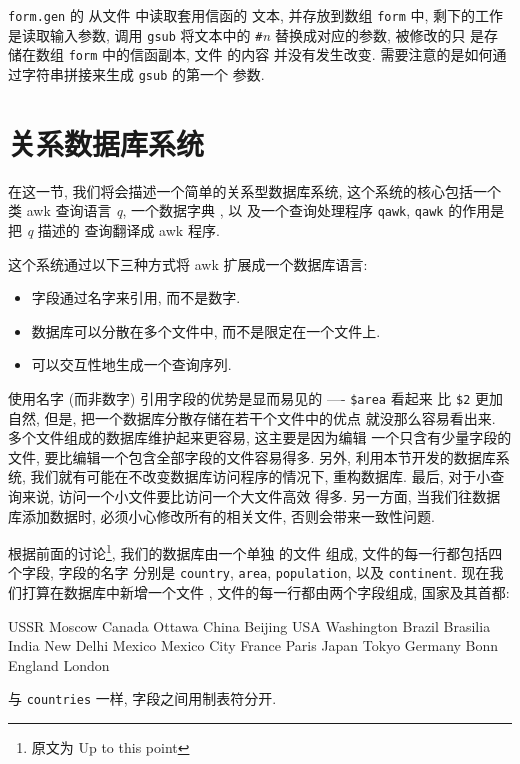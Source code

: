\verb'form.gen' 的 \BEGIN 从文件  中读取套用信函的
文本, 并存放到数组 \verb'form' 中, 剩下的工作是读取输入参数, 调用 
\verb'gsub' 将文本中的 \verb'#'\textit{n} 替换成对应的参数, 被修改的只 
是存储在数组 \verb'form' 中的信函副本, 文件  的内容
并没有发生改变. 需要注意的是如何通过字符串拼接来生成 \verb'gsub' 的第一个
参数.

\section{关系数据库系统}
\label{sec:a_relational_database_system}

在这一节, 我们将会描述一个简单的关系型数据库系统, 这个系统的核心包括一个
类 awk 查询语言 \textit{q}, 一个数据字典 , 以
及一个查询处理程序 \verb'qawk', \verb'qawk' 的作用是把 \textit{q} 描述的
查询翻译成 awk 程序.

这个系统通过以下三种方式将 awk 扩展成一个数据库语言:
\begin{itemize}
	\item 字段通过名字来引用, 而不是数字.
	\item 数据库可以分散在多个文件中, 而不是限定在一个文件上.
    \item 可以交互性地生成一个查询序列.
\end{itemize}
使用名字 (而非数字) 引用字段的优势是显而易见的 ---- \verb'$area' 看起来
比 \verb'$2' 更加自然, 但是, 把一个数据库分散存储在若干个文件中的优点
就没那么容易看出来. 多个文件组成的数据库维护起来更容易, 这主要是因为编辑
一个只含有少量字段的文件, 要比编辑一个包含全部字段的文件容易得多. 另外,
利用本节开发的数据库系统, 我们就有可能在不改变数据库访问程序的情况下,
重构数据库. 最后, 对于小查询来说, 访问一个小文件要比访问一个大文件高效
得多. 另一方面, 当我们往数据库添加数据时, 必须小心修改所有的相关文件, 
否则会带来一致性问题.

根据前面的讨论\footnote{原文为 Up to this point}, 我们的数据库由一个单独
的文件  组成, 文件的每一行都包括四个字段, 字段的名字
分别是 \verb'country', \verb'area', \verb'population', 以及
\verb'continent'. 现在我们打算在数据库中新增一个文件 ,
文件的每一行都由两个字段组成, 国家及其首都:
\begin{shell}
    USSR	Moscow
    Canada	Ottawa
    China	Beijing
    USA	Washington
    Brazil	Brasilia
    India	New Delhi
    Mexico	Mexico City
    France	Paris
    Japan	Tokyo
    Germany	Bonn
    England	London
\end{shell}
与 \verb'countries' 一样, 字段之间用制表符分开.

